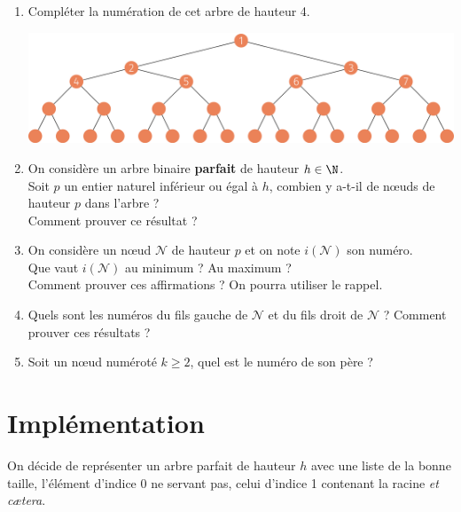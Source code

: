 \documentclass[a4paper,12pt,article,firamath]{nsi}
\begin{document}
    \begin{enumerate}
        \item Compléter la numération de cet arbre de hauteur 4.

        \begin{center}
            \includegraphics[width=\linewidth]{img/arbre3}
        \end{center}
        \item On considère un arbre binaire \textbf{parfait} de hauteur $h\in \N$.\\
        Soit $p$ un entier naturel inférieur ou égal à $h$, combien y a-t-il de n\oe uds de hauteur $p$ dans l'arbre ? \\
        Comment prouver ce résultat ?
        \item On considère un n\oe ud $\mathcal{N}$ de hauteur $p$ et on note $i\left(\mathcal{N}\right)$ son numéro.\\
        Que vaut $i\left(\mathcal{N}\right)$ au minimum ? Au maximum ?\\
        Comment prouver ces affirmations ? On pourra utiliser le rappel.
        \item Quels sont les numéros du fils gauche de $\mathcal{N}$ et du fils droit de $\mathcal{N}$ ? Comment prouver ces résultats ?
        \item Soit un n\oe ud numéroté $k\geqslant 2$, quel est le numéro de son père ?
    \end{enumerate}

    \section*{Implémentation}

    On décide de représenter un arbre parfait de hauteur $h$ avec une liste de la bonne taille, l'élément d'indice 0 ne servant pas, celui d'indice 1 contenant la racine \textit{et c\ae tera}.\\
\end{document}
